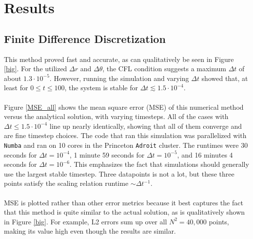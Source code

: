\documentclass{homework}
\begin{document}
\section{\textbf{Results}}

\subsection{\textbf{Finite Difference Discretization}}
This method proved fast and accurate, as can qualitatively be seen in Figure \ref{big}. For the utilized $\Delta r$ and $\Delta \theta$, the CFL condition suggests a maximum $\Delta t$ of about $1.3\cdot 10^{-5}$. However, running the simulation and varying $\Delta t$ showed that, at least for $0\leq t \leq 100$, the system is stable for $\Delta t \lesssim 1.5 \cdot 10^{-4}$.
\\ \\ \noindent
Figure \ref{MSE_all} shows the mean square error (MSE) of this numerical method versus the analytical solution, with varying timesteps. All of the cases with $\Delta t \leq 1.5 \cdot 10^{-4}$ line up nearly identically, showing that all of them converge and are fine timestep choices. The code that ran this simulation was parallelized with \texttt{Numba} and ran on 10 cores in the Princeton \texttt{Adroit} cluster. The runtimes were 30 seconds for $\Delta t = 10^{-4}$, 1 minute 59 seconds for $\Delta t = 10^{-5}$, and 16 minutes 4 seconds for $\Delta t = 10^{-6}$. This emphasizes the fact that simulations should generally use the largest stable timestep. Three datapoints is not a lot, but these three points satisfy the scaling relation runtime $\sim \Delta t ^{-1}$.
\\ \\ \noindent
MSE is plotted rather than other error metrics because it best captures the fact that this method is quite similar to the actual solution, as is qualitatively shown in Figure \ref{big}. For example, L2 errors sum up over all $N^2=40,000$ points, making its value high even though the results are similar. 
\end{document}
